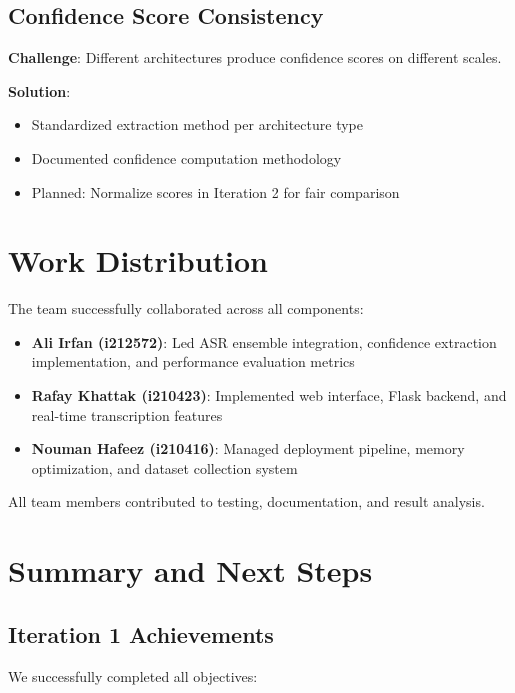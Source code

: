 \subsection{Confidence Score Consistency}

\textbf{Challenge}: Different architectures produce confidence scores on different scales.

\textbf{Solution}:
\begin{itemize}
    \item Standardized extraction method per architecture type
    \item Documented confidence computation methodology
    \item Planned: Normalize scores in Iteration 2 for fair comparison
\end{itemize}

\section{Work Distribution}

The team successfully collaborated across all components:

\begin{itemize}
    \item \textbf{Ali Irfan (i212572)}: Led ASR ensemble integration, confidence extraction implementation, and performance evaluation metrics
    \item \textbf{Rafay Khattak (i210423)}: Implemented web interface, Flask backend, and real-time transcription features
    \item \textbf{Nouman Hafeez (i210416)}: Managed deployment pipeline, memory optimization, and dataset collection system
\end{itemize}

All team members contributed to testing, documentation, and result analysis.

\section{Summary and Next Steps}

\subsection{Iteration 1 Achievements}

We successfully completed all objectives:

